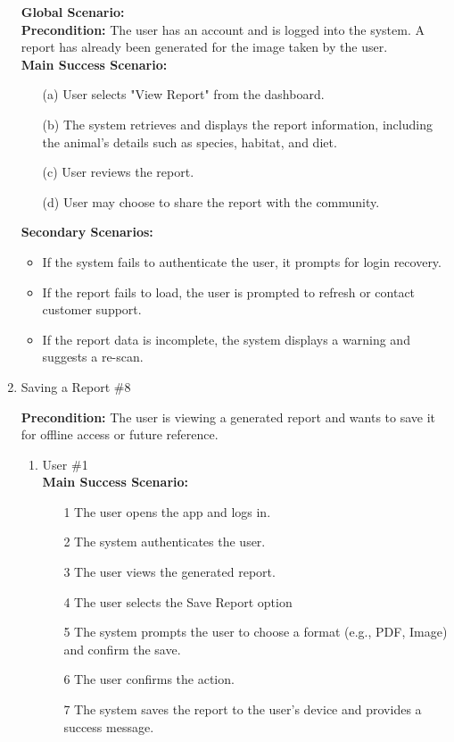 \documentclass[]{article}
\begin{document}
\begin{enumerate}[{\bf BE1.}]
    \textbf{Global Scenario:} \\
    \textbf{Precondition:} The user has an account and is logged into the system. A report has already been generated for the image taken by the user. \\

    \textbf{Main Success Scenario:}
    \begin{enumerate}
        \item[(a)] User selects "View Report" from the dashboard.
        \item[(b)] The system retrieves and displays the report information, including the animal's details such as species, habitat, and diet.
        \item[(c)] User reviews the report.
        \item[(d)] User may choose to share the report with the community.
    \end{enumerate}

    \textbf{Secondary Scenarios:}
    \begin{itemize}
        \item If the system fails to authenticate the user, it prompts for login recovery.
        \item If the report fails to load, the user is prompted to refresh or contact customer support.
        \item If the report data is incomplete, the system displays a warning and suggests a re-scan.
    \end{itemize}

\item Saving a Report \#8

    \textbf{Precondition:} The user is viewing a generated report and wants to save it for offline access or future reference.

    \begin{enumerate}[{\bf VP1.}]
        \item User \#1 \\

            \textbf{Main Success Scenario:}
            \begin{enumerate}
                \item[1] The user opens the app and logs in.
                \item[2] The system authenticates the user.
                \item[3] The user views the generated report.
                \item[4] The user selects the Save Report option
                \item[5] The system prompts the user to choose a format (e.g., PDF, Image) and confirm the save.
                \item[6] The user confirms the action.
                \item[7] The system saves the report to the user’s device and provides a success message.
            \end{enumerate}


\end{enumerate}
\end{enumerate}
\end{document}
